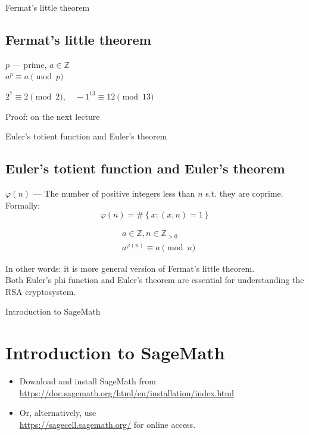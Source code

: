 \documentclass{beamer}
\begin{document}
\begin{frame}{Fermat's little theorem}
    \subsection{Fermat's little theorem}
    \begin{Theorem}
        $p$ --- prime, $a \in \mathbb{Z}$ \\
        $a^p \equiv a \pmod p$
    \end{Theorem}
    \begin{example}
        $ 2^7 \equiv 2 \pmod 2, \quad -1^{13} \equiv 12 \pmod {13} $
    \end{example}
    Proof: on the next lecture
\end{frame}

\begin{frame}{Euler's totient function and Euler's theorem}
    \subsection{Euler's totient function and Euler's theorem}
    \begin{definition}
        $\varphi(n)$ --- The number of positive integers less than $n$ s.t. they are coprime.
        Formally:
        \begin{equation*}
            \varphi(n) = \# \left\{ x : (x, n) = 1 \right\}
        \end{equation*} 
    \end{definition}
    \begin{Theorem}
        \begin{eqnarray*}
            & a \in \mathbb{Z}, n \in \mathbb{Z}_{>0} \\
            & a^{\varphi(n)} \equiv a \pmod n
        \end{eqnarray*}
    \end{Theorem}
    In other words: it is more general version of Fermat's little theorem. \\
    Both Euler's phi function and Euler's theorem are essential for understanding the RSA cryptosystem.
\end{frame}

\begin{frame}{Introduction to SageMath}
    \section{Introduction to SageMath}
    \begin{itemize}
        \item Download and install SageMath from \\ \url{https://doc.sagemath.org/html/en/installation/index.html}
        \item Or, alternatively, use \\ \url{https://sagecell.sagemath.org/} for online access.
    \end{itemize}
\end{frame}
\end{document}
